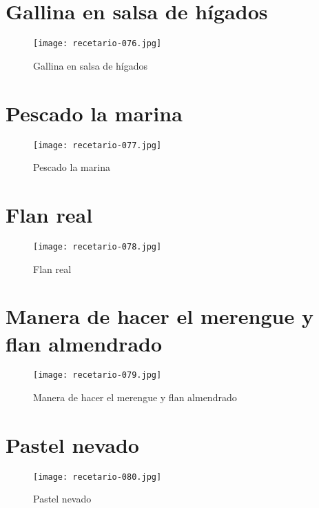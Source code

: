 \documentclass[12pt,letterpaper]{article}
\begin{document}
\newpage

\section{Gallina en salsa de hígados}
  \begin{figure}[H]
    \vspace{2pt}
  \texttt{[image: recetario-076.jpg]}
    \caption{Gallina en salsa de hígados}
    
  \end{figure}

\newpage

\section{Pescado la marina}
  \begin{figure}[H]
    \vspace{2pt}
  \texttt{[image: recetario-077.jpg]}
    \caption{Pescado la marina}
    
  \end{figure}

\newpage

\section{Flan real}
  \begin{figure}[H]
    \vspace{2pt}
  \texttt{[image: recetario-078.jpg]}
    \caption{Flan real}
    
  \end{figure}

\newpage

\section{Manera de hacer el merengue y flan almendrado}
  \begin{figure}[H]
    \vspace{2pt}
  \texttt{[image: recetario-079.jpg]}
    \caption{Manera de hacer el merengue y flan almendrado}
    
  \end{figure}

\newpage

\section{Pastel nevado}
  \begin{figure}[H]
    \vspace{2pt}
  \texttt{[image: recetario-080.jpg]}
    \caption{Pastel nevado}
    
  \end{figure}
\end{document}
